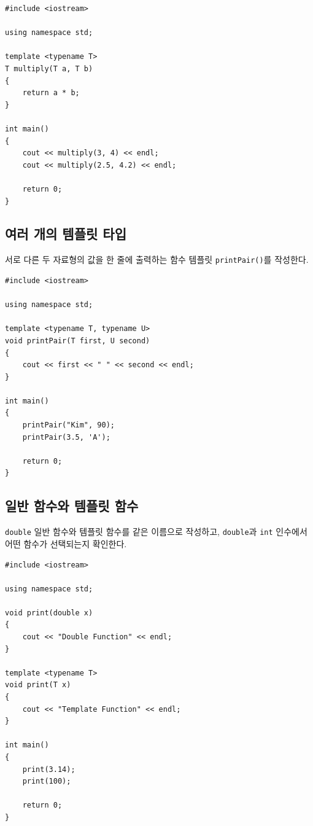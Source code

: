 \documentclass[11pt,a4paper]{article}
\begin{document}
\begin{lstlisting}
#include <iostream>

using namespace std;

template <typename T>
T multiply(T a, T b)
{
    return a * b;
}

int main()
{
    cout << multiply(3, 4) << endl;
    cout << multiply(2.5, 4.2) << endl;

    return 0;
}
\end{lstlisting}

\subsection{여러 개의 템플릿 타입}
\begin{practicebox}
서로 다른 두 자료형의 값을 한 줄에 출력하는 함수 템플릿 \texttt{printPair()}를 작성한다.
\end{practicebox}

\begin{lstlisting}
#include <iostream>

using namespace std;

template <typename T, typename U>
void printPair(T first, U second)
{
    cout << first << " " << second << endl;
}

int main()
{
    printPair("Kim", 90);
    printPair(3.5, 'A');

    return 0;
}
\end{lstlisting}

\subsection{일반 함수와 템플릿 함수}
\begin{practicebox}
\texttt{double} 일반 함수와 템플릿 함수를 같은 이름으로 작성하고, \texttt{double}과 \texttt{int} 인수에서 어떤 함수가 선택되는지 확인한다.
\end{practicebox}

\begin{lstlisting}
#include <iostream>

using namespace std;

void print(double x)
{
    cout << "Double Function" << endl;
}

template <typename T>
void print(T x)
{
    cout << "Template Function" << endl;
}

int main()
{
    print(3.14);
    print(100);

    return 0;
}
\end{lstlisting}
\end{document}
